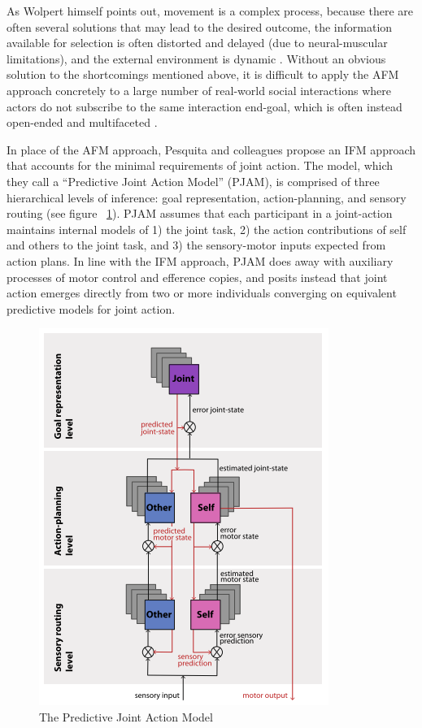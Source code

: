 \begin{CJK}{UTF8}{gbsn}
As Wolpert himself points out, movement is a complex process, because there are often several solutions that may lead to the desired outcome, the information available for selection is often distorted and delayed (due to neural-muscular limitations), and the external environment is dynamic \citep{Wolpert1997}. Without an obvious solution to the shortcomings mentioned above, it is difficult to apply the AFM approach concretely to a large number of real-world social interactions where actors do not subscribe to the same interaction end-goal, which is often instead open-ended and multifaceted \citep{Pesquita2017}.

In place of the AFM approach, Pesquita and colleagues \textcite{Pesquita2017} propose an IFM approach that accounts for the minimal requirements of joint action.  The model, which they call a ``Predictive Joint Action Model'' (PJAM), is comprised of three hierarchical levels of inference: goal representation, action-planning, and sensory routing (see figure ~\ref{fig:PJAM}). PJAM assumes that each participant in a joint-action maintains internal models of 1) the joint task, 2) the action contributions of self and others to the joint task, and  3) the sensory-motor inputs expected from action plans.  In line with the IFM approach, PJAM does away with auxiliary processes of motor control and efference copies, and posits instead that joint action emerges directly from two or more individuals converging on equivalent predictive models for joint action.

\begin{figure}[htbp]
  \begin{center}
    \includegraphics[scale=.8]{images/PJAM.png}
      \caption{The Predictive Joint Action Model \citep{Pesquita2017}}
        \label{fig:PJAM}
   \end{center}
\end{figure}


\end{CJK}
